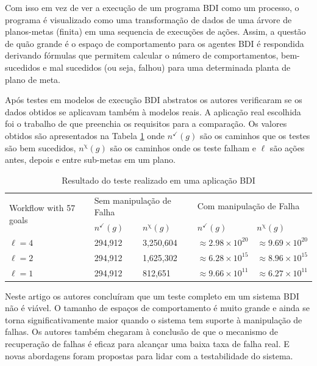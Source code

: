 \documentclass[dm,ppgcomp]{texfurg} %
\begin{document}
Com isso em vez de ver a execução de um programa BDI como um processo, o programa é visualizado como uma transformação de dados de uma árvore de planos-metas (finita) em uma sequencia de execuções de ações. Assim, a questão de quão grande é o espaço de comportamento para os agentes BDI é respondida derivando fórmulas que permitem calcular o número de comportamentos, bem-sucedidos e mal sucedidos (ou seja, falhou) para uma determinada planta de plano de meta.

Após testes em modelos de execução BDI abstratos os autores verificaram se os dados obtidos se aplicavam também à modelos reais. A aplicação real escolhida foi o trabalho de \cite{burmeister2008bdi} que preenchia os requisitos para a comparação. Os valores obtidos são apresentados na Tabela \ref{tab:result_ontestability} onde $n^{\checkmark}(g)$ são os caminhos que os testes são bem sucedidos, $n^{\upchi}(g)$ são os caminhos onde os teste falham e $\ell$ são ações antes, depois e entre sub-metas em um plano.

\begin{table}[ht]
\centering
\caption{Resultado do teste realizado em uma aplicação BDI}
\label{tab:result_ontestability}
\begin{tabular}{@{}lllll@{}}
\toprule
\multirow{2}{*}{Workflow with 57 goals} & \multicolumn{2}{l}{Sem manipulação de Falha} & \multicolumn{2}{l}{Com manipulação de Falha}                  \\
                                        & $n^{\checkmark}(g)$     & $n^{\upchi}(g)$    & $n^{\checkmark}(g)$           & $n^{\upchi}(g)$               \\ \midrule
$\ell = 4$                              & 294,912                 & 3,250,604          & $\approx 2.98 \times 10^{20}$ & $\approx 9.69 \times 10^{20}$ \\
$\ell = 2$                              & 294,912                 & 1,625,302          & $\approx 6.28 \times 10^{15}$ & $\approx 8.96 \times 10^{15}$ \\
$\ell = 1$                              & 294,912                 & 812,651            & $\approx 9.66 \times 10^{11}$ & $\approx 6.27 \times 10^{11}$ \\ \bottomrule
\end{tabular}
\end{table}

Neste artigo os autores concluíram que um teste completo em um sistema BDI não é viável. O tamanho de espaços de comportamento é muito grande e ainda se torna significativamente maior quando o sistema tem suporte à manipulação de falhas. Os autores também chegaram à conclusão de que o mecanismo de recuperação de falhas é eficaz para alcançar uma baixa taxa de falha real. E novas abordagens foram propostas para lidar com a testabilidade do sistema.
\end{document}
